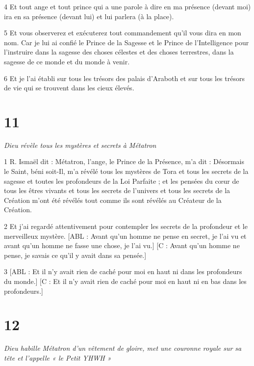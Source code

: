 \par 4 Et tout ange et tout prince qui a une parole à dire en ma présence (devant moi) ira en sa présence (devant lui) et lui parlera (à la place).

\par 5 Et vous observerez et exécuterez tout commandement qu'il vous dira en mon nom. Car je lui ai confié le Prince de la Sagesse et le Prince de l'Intelligence pour l'instruire dans la sagesse des choses célestes et des choses terrestres, dans la sagesse de ce monde et du monde à venir.

\par 6 Et je l'ai établi sur tous les trésors des palais d'Araboth et sur tous les trésors de vie qui se trouvent dans les cieux élevés.

\chapter{11}

\par \textit{Dieu révèle tous les mystères et secrets à Métatron}

\par 1 R. Ismaël dit : Métatron, l'ange, le Prince de la Présence, m'a dit : Désormais le Saint, béni soit-Il, m'a révélé tous les mystères de Tora et tous les secrets de la sagesse et toutes les profondeurs de la Loi Parfaite ; et les pensées du cœur de tous les êtres vivants et tous les secrets de l'univers et tous les secrets de la Création m'ont été révélés tout comme ils sont révélés au Créateur de la Création.

\par 2 Et j'ai regardé attentivement pour contempler les secrets de la profondeur et le merveilleux mystère. [ABL : Avant qu'un homme ne pense en secret, je l'ai vu et avant qu'un homme ne fasse une chose, je l'ai vu.] [C : Avant qu'un homme ne pense, je savais ce qu'il y avait dans sa pensée.]

\par 3 [ABL : Et il n’y avait rien de caché pour moi en haut ni dans les profondeurs du monde.] [C : Et il n’y avait rien de caché pour moi en haut ni en bas dans les profondeurs.]

\chapter{12}

\par \textit{Dieu habille Métatron d'un vêtement de gloire, met une couronne royale sur sa tête et l'appelle « le Petit YHWH »}

